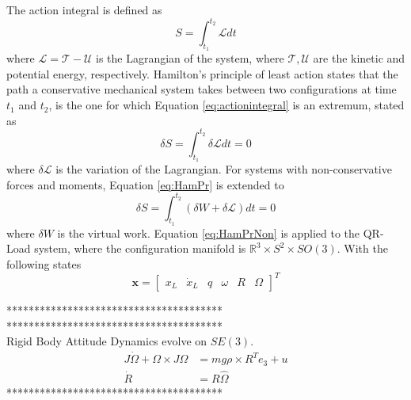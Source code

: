 The action integral is defined as
\begin{equation}\label{eq:actionintegral}
S=\int_{t_1}^{t_2}\mathcal{L}dt
\end{equation}
where $\mathcal{L}=\mathcal{T}-\mathcal{U} $ is the Lagrangian of the system, where $\mathcal{T},\mathcal{U}$ are the kinetic and potential energy, respectively. Hamilton's principle of least action states that the path a conservative mechanical system takes between two configurations at time $ t_1 $ and $ t_2 $, is the one for which Equation \ref{eq:actionintegral} is an extremum, stated as
\begin{equation}\label{eq:HamPr}
\delta S=\int_{t_1}^{t_2}\delta\mathcal{L}dt=0
\end{equation}
where $ \delta\mathcal{L} $ is the variation of the Lagrangian. For systems with non-conservative forces and moments, Equation \ref{eq:HamPr} is extended to
\begin{equation}\label{eq:HamPrNon}
\delta S=\int_{t_1}^{t_2}(\delta W+\delta\mathcal{L})dt=0
\end{equation}
where $ \delta W $ is the virtual work. Equation \ref{eq:HamPrNon} is applied to the QR-Load system, where the configuration manifold is $ \mathbb{R}^3\times S^2\times SO(3) $. With the following states
\begin{equation}\label{key}
\textbf{x}= \begin{bmatrix}x_L& \dot{x}_L& q& \omega&R&\Omega
\end{bmatrix}^T
\end{equation}


***************************************\\

***************************************\\
Rigid Body Attitude Dynamics evolve on $ SE(3) $.
\begin{align}\label{eq:eomrigidbody}
J\dot{\Omega}+\Omega\times J\Omega &= mg\rho\times R^Te_3+u\\ 
\dot{R} &= R\hat{\Omega}
\end{align}
***************************************\\


